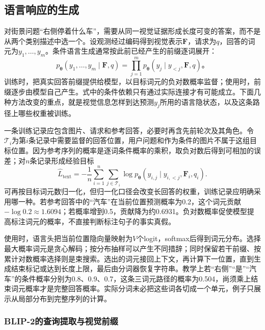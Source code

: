 \subsection{语言响应的生成}
\label{sec:vision-models-language-generation}

对街景问题“右侧停着什么车”，需要从同一视觉证据形成长度可变的答案，而不是从两个类别描述中选一个。设观测经过编码得到视觉表示$\bm{F}$，请求为$q$，回答的词元为$y_1,\ldots,y_m$。条件语言生成通常按此前已经产生的前缀逐词展开：
\begin{equation}
  p_{\bm\theta}(y_1,\ldots,y_m\mid\bm F,q)
  =\prod_{j=1}^m p_{\bm\theta}(y_j\mid y_{<j},\bm F,q)\text{。}
  \label{eq:vision-vlm-language}
\end{equation}
训练时，把真实回答前缀提供给模型，以目标词元的负对数概率监督；使用时，前缀逐步由模型自己产生。式中的条件依赖只有通过实际连接才有可能成立。下面几种方法改变的重点，就是视觉信息怎样到达预测$y_j$所用的语言隐状态，以及这条路径上哪些权重被训练。

一条训练记录应包含图片、请求和参考回答，必要时再含先前轮次及其角色。令$\mathcal T_i$为第$i$条记录中需要监督的回答位置，用户问题和作为条件的图片不属于这组目标位置。因为参考序列的概率是逐词条件概率的乘积，取负对数后得到可相加的误差；对$n$条记录形成经验目标
\begin{equation}
  \widehat L_{\mathrm{text}}
   =-\frac1n\sum_{i=1}^n\sum_{j\in\mathcal T_i}
      \log p_{\bm\theta}(y_{i,j}\mid
          y_{i,<j},\bm F_i,q_i).
  \label{eq:vision-vlm-text-objective}
\end{equation}
可再按目标词元数归一化，但归一化口径会改变长回答的权重，训练记录应明确采用哪一种。若参考回答中的“汽车”在当前位置预测概率为0.2，这个词元贡献$-\log0.2\approx1.6094$；若概率增到0.5，贡献降为约0.6931。负对数概率促使模型提高标注词元的概率，不直接判断标注句子的事实真假。

使用时，语言头把当前位置隐向量映射为$V$个logit，softmax后得到词元分布。选择最大概率词元是贪心解码；按分布抽样可以产生不同措辞；同时保留若干前缀、按累计对数概率选择则是束搜索。选出的词元接回上下文，再计算下一位置，直到生成结束标记或达到长度上限，最后由分词器恢复字符串。教学上若“右侧”“是”“汽车”的条件概率分别为0.8、0.9、0.7，这条三词元路径的概率为0.504，尚须乘上结束词元概率才是完整回答概率。实际分词未必把这些词各切成一个单元，例子只展示从局部分布到完整序列的计算。

\subsubsection{BLIP-2的查询提取与视觉前缀}
\label{sec:vision-models-blip2}

